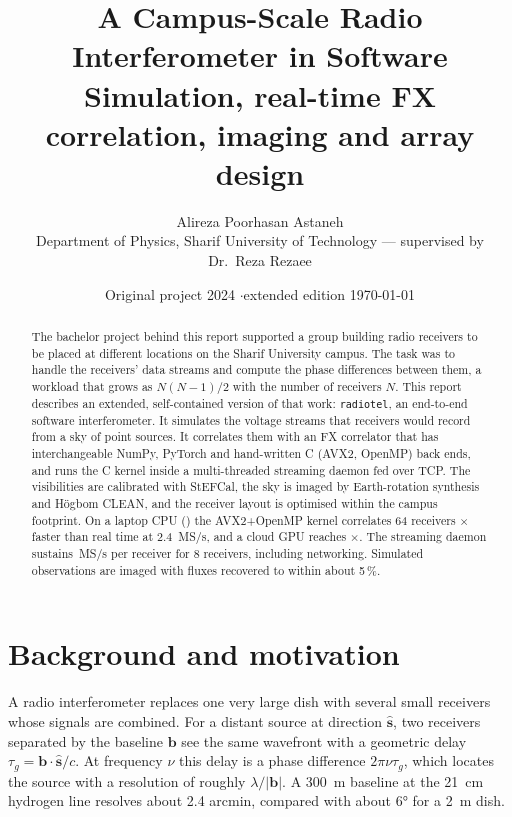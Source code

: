 \documentclass[11pt,a4paper]{article}
\title{\textbf{A Campus-Scale Radio Interferometer in Software}\\[4pt]
\large Simulation, real-time FX correlation, imaging and array design}
\author{Alireza Poorhasan Astaneh\\
\small Department of Physics, Sharif University of Technology --- supervised by Dr.\ Reza Rezaee}
\date{Original project 2024 \quad$\cdot$\quad extended edition \today}
\begin{document}
\maketitle

\begin{abstract}
\noindent
The bachelor project behind this report supported a group building radio receivers to be placed at
different locations on the Sharif University campus. The task was to handle the receivers' data
streams and compute the phase differences between them, a workload that grows as $N(N-1)/2$ with
the number of receivers $N$. This report describes an extended, self-contained version of that work:
\texttt{radiotel}, an end-to-end software interferometer. It simulates the voltage streams that
receivers would record from a sky of point sources. It correlates them with an FX correlator that has
interchangeable NumPy, PyTorch and hand-written C (AVX2, OpenMP) back ends, and runs the C kernel
inside a multi-threaded streaming daemon fed over TCP. The visibilities are calibrated with StEFCal,
the sky is imaged by Earth-rotation synthesis and Högbom CLEAN, and the receiver layout is optimised
within the campus footprint. On a laptop CPU (\CPUModel) the AVX2+OpenMP kernel correlates
64 receivers \RtfOmpSixtyFour$\times$ faster than real time at \SI{2.4}{MS/s}, and a cloud GPU
reaches \RtfCudaSixtyFour$\times$. The streaming daemon
sustains \StreamMspsEight\,MS/s per receiver for 8 receivers, including networking. Simulated
observations are imaged with fluxes recovered to within about 5\,\%.
\end{abstract}

\tableofcontents
\vspace{1em}

\section{Background and motivation}

A radio interferometer replaces one very large dish with several small receivers whose signals are
combined. For a distant source at direction $\hat{\mathbf s}$, two receivers separated by the baseline
$\mathbf b$ see the same wavefront with a geometric delay $\tau_g = \mathbf b\cdot\hat{\mathbf s}/c$.
At frequency $\nu$ this delay is a phase difference $2\pi\nu\tau_g$, which locates the source with a
resolution of roughly $\lambda/|\mathbf b|$. A \SI{300}{m} baseline at the \SI{21}{cm} hydrogen line
resolves about 2.4 arcmin, compared with about \ang{6} for a \SI{2}{m} dish.
\end{document}
